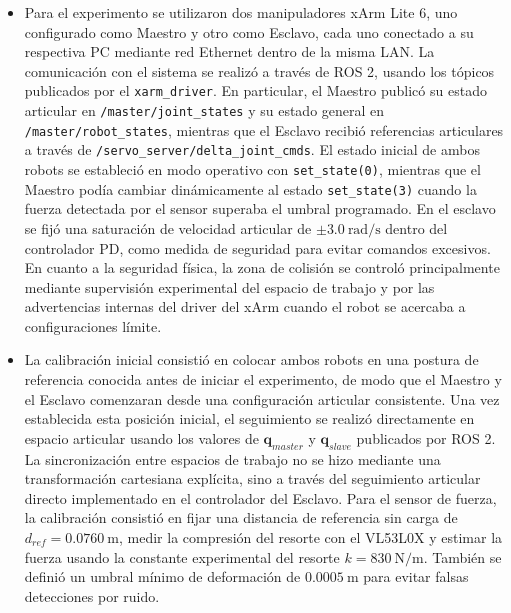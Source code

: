\documentclass[journal,10pt,twoside]{IEEEtran}
\begin{document}
\begin{itemize}
    \item Para el experimento se utilizaron dos manipuladores xArm Lite 6, uno configurado como Maestro y otro como Esclavo, cada uno conectado a su respectiva PC mediante red Ethernet dentro de la misma LAN. La comunicación con el sistema se realizó a través de ROS 2, usando los tópicos publicados por el \texttt{xarm\_driver}. En particular, el Maestro publicó su estado articular en \texttt{/master/joint\_states} y su estado general en \texttt{/master/robot\_states}, mientras que el Esclavo recibió referencias articulares a través de \texttt{/servo\_server/delta\_joint\_cmds}. El estado inicial de ambos robots se estableció en modo operativo con \texttt{set\_state(0)}, mientras que el Maestro podía cambiar dinámicamente al estado \texttt{set\_state(3)} cuando la fuerza detectada por el sensor superaba el umbral programado. En el esclavo se fijó una saturación de velocidad articular de \(\pm 3.0\ \text{rad/s}\) dentro del controlador PD, como medida de seguridad para evitar comandos excesivos. En cuanto a la seguridad física, la zona de colisión se controló principalmente mediante supervisión experimental del espacio de trabajo y por las advertencias internas del driver del xArm cuando el robot se acercaba a configuraciones límite.
    \\

    \item La calibración inicial consistió en colocar ambos robots en una postura de referencia conocida antes de iniciar el experimento, de modo que el Maestro y el Esclavo comenzaran desde una configuración articular consistente. Una vez establecida esta posición inicial, el seguimiento se realizó directamente en espacio articular usando los valores de \(\bm{q}_{master}\) y \(\bm{q}_{slave}\) publicados por ROS 2. La sincronización entre espacios de trabajo no se hizo mediante una transformación cartesiana explícita, sino a través del seguimiento articular directo implementado en el controlador del Esclavo. Para el sensor de fuerza, la calibración consistió en fijar una distancia de referencia sin carga de \(d_{ref}=0.0760\ \text{m}\), medir la compresión del resorte con el VL53L0X y estimar la fuerza usando la constante experimental del resorte \(k=830\ \text{N/m}\). También se definió un umbral mínimo de deformación de \(0.0005\ \text{m}\) para evitar falsas detecciones por ruido.
    \\


\end{itemize}
\end{document}
